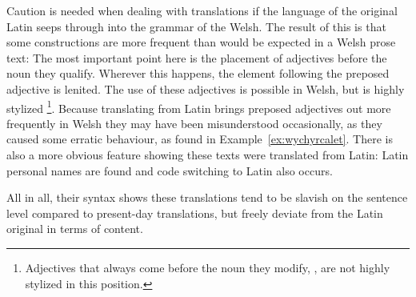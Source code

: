 Caution is needed when dealing with translations if the language of the original Latin seeps through into the grammar of the Welsh.
The result of this is that some constructions are more frequent than would be expected in a Welsh prose text:
The most important point here is the placement of adjectives before the noun they qualify.
Wherever this happens, the element following the preposed adjective is lenited.
The use of these adjectives is possible in Welsh, but is highly stylized%
\footnote{Adjectives that always come before the noun they modify, \eg {}, are not highly stylized in this position.}.
Because translating from Latin brings preposed adjectives out more frequently in Welsh they may have been misunderstood occasionally, as they caused some erratic behaviour, as found in Example~\ref{ex:wychyrcalet}.
There is also a more obvious feature showing these texts were translated from Latin: Latin personal names are found and code switching to Latin also occurs.  

All in all, their syntax shows these translations tend to be slavish on the sentence level compared to present-day translations, but freely deviate from the Latin original in terms of content. 

